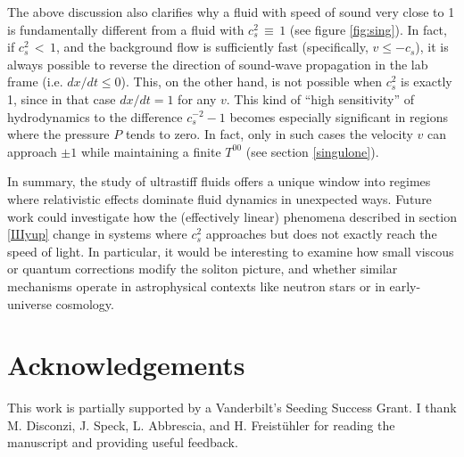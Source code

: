 \documentclass[a4paper, amsfonts, amssymb, amsmath, reprint, showkeys, nofootinbib, twoside,notitlepage,onecolumn]{revtex4-2}
\theoremstyle{definition}
\theoremstyle{theorem}
\theoremstyle{corollary}
\begin{document}
The above discussion also clarifies why a fluid with speed of sound very close to 1 is fundamentally different from a fluid with $c_s^2 \, {\equiv}\, 1$ (see figure \ref{fig:sing}). In fact, if $c_s^2\,{<}\, 1$, and the background flow is sufficiently fast (specifically, $v{\leq} {-}c_s$), it is always possible to reverse the direction of sound-wave propagation in the lab frame (i.e. $dx/dt\leq 0$). This, on the other hand, is not possible when $c_s^2$ is exactly 1, since in that case $dx/dt =1$ for any $v$. This kind of ``high sensitivity'' of hydrodynamics to the difference $c_s^{-2}-1$ becomes especially significant in regions where the pressure $P$ tends to zero. In fact, only in such cases the velocity $v$ can approach $\pm 1$ while maintaining a finite $T^{00}$ (see section \ref{singulone}).


In summary, the study of ultrastiff fluids offers a unique window into regimes where relativistic effects dominate fluid dynamics in unexpected ways. Future work could investigate how the (effectively linear) phenomena described in section \ref{IIIyup} change in systems where $c_s^2$ approaches but does not exactly reach the speed of light. In particular, it would be interesting to examine how small viscous or quantum corrections modify the soliton picture, and whether similar mechanisms operate in astrophysical contexts like neutron stars or in early-universe cosmology. 


\section*{Acknowledgements}

This work is partially supported by a Vanderbilt's Seeding Success Grant. I thank M. Disconzi, J. Speck, L. Abbrescia, and 
H. Freist\"{u}hler for reading the manuscript and providing useful feedback.



\appendix





\label{lastpage}
\end{document}
